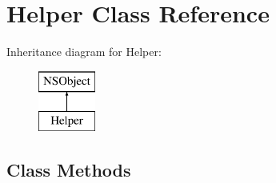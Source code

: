 \hypertarget{interface_helper}{}\section{Helper Class Reference}
\label{interface_helper}
Inheritance diagram for Helper\+:\begin{figure}[H]
\begin{center}
\leavevmode
\includegraphics[height=2.000000cm]{interface_helper}
\end{center}
\end{figure}
\subsection*{Class Methods}
